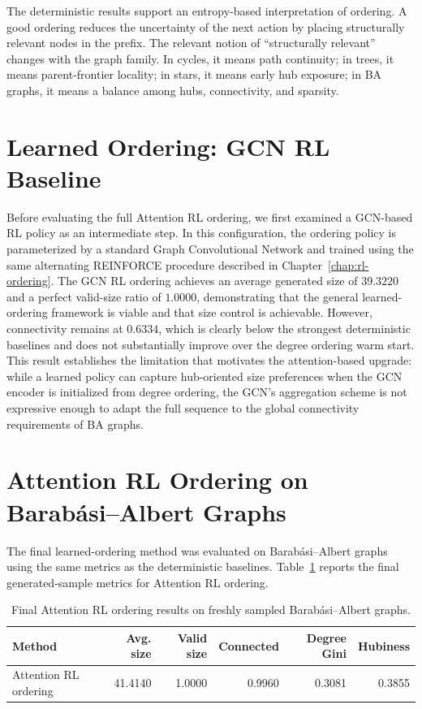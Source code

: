 The deterministic results support an entropy-based interpretation of ordering. A good ordering reduces the uncertainty of the next action by placing structurally relevant nodes in the prefix. The relevant notion of ``structurally relevant'' changes with the graph family. In cycles, it means path continuity; in trees, it means parent-frontier locality; in stars, it means early hub exposure; in BA graphs, it means a balance among hubs, connectivity, and sparsity.

\section{Learned Ordering: GCN RL Baseline}
\label{sec:results-gcn-rl}

Before evaluating the full Attention RL ordering, we first examined a GCN-based RL policy as an intermediate step. In this configuration, the ordering policy is parameterized by a standard Graph Convolutional Network \cite{kipf2017gcn} and trained using the same alternating REINFORCE procedure described in Chapter~\ref{chap:rl-ordering}. The GCN RL ordering achieves an average generated size of $39.3220$ and a perfect valid-size ratio of $1.0000$, demonstrating that the general learned-ordering framework is viable and that size control is achievable. However, connectivity remains at $0.6334$, which is clearly below the strongest deterministic baselines and does not substantially improve over the degree ordering warm start. This result establishes the limitation that motivates the attention-based upgrade: while a learned policy can capture hub-oriented size preferences when the GCN encoder is initialized from degree ordering, the GCN's aggregation scheme is not expressive enough to adapt the full sequence to the global connectivity requirements of BA graphs.

\section{Attention RL Ordering on Barab\'asi--Albert Graphs}
\label{sec:results-attention-rl}

The final learned-ordering method was evaluated on Barab\'asi--Albert graphs using the same metrics as the deterministic baselines. Table~\ref{tab:ba-rl-final} reports the final generated-sample metrics for Attention RL ordering.

\begin{table}[H]
\centering
\footnotesize
\begin{tabular}{lrrrrr}
\toprule
\textbf{Method} & \textbf{Avg. size} & \textbf{Valid size} & \textbf{Connected} & \textbf{Degree Gini} & \textbf{Hubiness} \\
\midrule
Attention RL ordering & 41.4140 & 1.0000 & 0.9960 & 0.3081 & 0.3855 \\
\bottomrule
\end{tabular}
\caption{Final Attention RL ordering results on freshly sampled Barab\'asi--Albert graphs.}
\label{tab:ba-rl-final}
\end{table}

